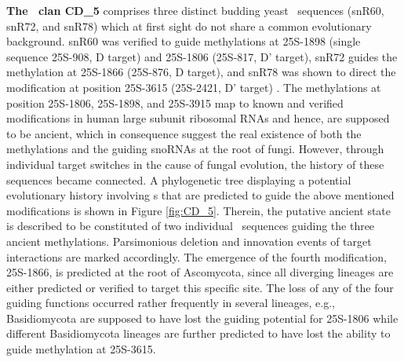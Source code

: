 \textbf{The \sno\ clan CD\_5} comprises three distinct budding yeast
\sno\ sequences (snR60, snR72, and snR78) which at first sight do not
share a common evolutionary background. snR60 was verified to guide
methylations at 25S-1898 (single sequence 25S-908, D target) and
25S-1806 (25S-817, D' target), snR72 guides the methylation at
25S-1866 (25S-876, D target), and snR78 was shown to direct the
modification at position 25S-3615 (25S-2421, D' target)
\cite{Lowe:1999}. The methylations at position 25S-1806, 25S-1898, and
25S-3915 map to known and verified modifications in human large
subunit ribosomal RNAs and hence, are supposed to be ancient, which in
consequence suggest the real existence of both the methylations and
the guiding snoRNAs at the root of fungi.  However, through individual
target switches in the cause of fungal evolution, the history of these
sequences became connected. A phylogenetic tree displaying a potential
evolutionary history involving \sno s that are predicted to guide the
above mentioned modifications is shown in Figure
\ref{fig:CD_5}. Therein, the putative ancient state is described to be
constituted of two individual \sno\ sequences guiding the three
ancient methylations.  Parsimonious deletion and innovation events of
target interactions are marked accordingly. The emergence of the
fourth modification, 25S-1866, is predicted at the root of Ascomycota,
since all diverging lineages are either predicted or verified to
target this specific site. The loss of any of the four guiding
functions occurred rather frequently in several lineages, e.g.,
Basidiomycota are supposed to have lost the guiding potential for
25S-1806 while different Basidiomycota lineages are further predicted
to have lost the ability to guide methylation at 25S-3615.

